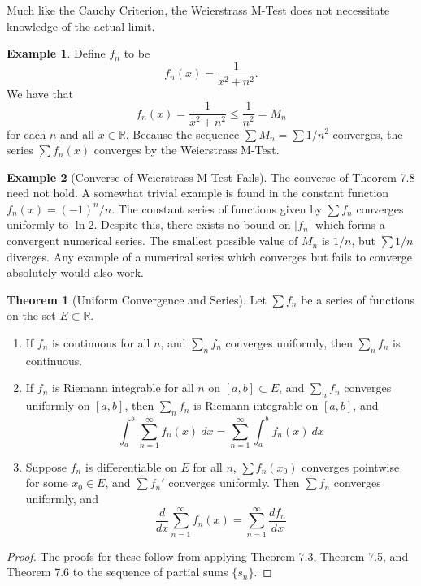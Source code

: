 \documentclass{article}
\newcommand{\R}{\mathbb{R}}
\theoremstyle{definition}
\newtheorem{theorem}{Theorem}[section]
\newtheorem{example}{Example}[section]
\begin{document}
Much like the Cauchy Criterion, the Weierstrass M-Test does not necessitate knowledge of the actual limit. 
\begin{example}
	Define $ f_n $ to be $$ f_n(x)=\frac{1}{x^2+n^2}.$$ We have that $$  f_n(x)=\frac{1}{x^2+n^2}\le \frac{1}{n^2}=M_n$$ for each $ n $ and all $ x\in\R $. Because the sequence $ \sum M_n=\sum 1/n^2 $ converges, the series $ \sum f_n(x) $ converges by the Weierstrass M-Test. 
\end{example}

\begin{example}[Converse of Weierstrass M-Test Fails]
	The converse of Theorem 7.8 need not hold. A somewhat trivial example is found in the constant function $ f_n(x)=(-1)^n/n $. The constant series of functions given by $ \sum f_n  $ converges uniformly to $ \ln 2 $. Despite this, there exists no bound on $ |f_n| $ which forms a convergent numerical series. The smallest possible value of $ M_n $ is $ 1/n $, but $ \sum 1/n $ diverges. Any example of a numerical series which converges but fails to converge absolutely would also work.
\end{example}

\begin{theorem}[Uniform Convergence and Series]
	Let $ \sum f_n $ be a series of functions on the set $ E\subset \R $.
	\begin{enumerate}
		\item If $ f_n $ is continuous for all $ n $, and $ \sum_n f_n $ converges uniformly, then $  \sum_n f_n $ is continuous. 
		\item If $ f_n $ is Riemann integrable for all $ n $ on $ [a,b]\subset E $, and $ \sum_n f_n $ converges uniformly on $ [a,b] $, then $  \sum_n f_n $ is Riemann integrable on $ [a,b] $, and $$ \int_{a}^{b}\sum_{n=1}^{\infty}f_n(x)\ dx=\sum_{n=1}^{\infty}\int_{a}^{b}f_n(x)\ dx $$ 
		\item Suppose $ f_n $ is differentiable on $ E $ for all $ n $, $ \sum f_n(x_0) $ converges pointwise for some $ x_0\in E $, and $ \sum f_n' $ converges uniformly. Then $ \sum f_n $ converges uniformly, and $$\frac{d}{dx}\sum_{n=1}^{\infty}f_n(x)=\sum_{n=1}^{\infty}\frac{df_n}{dx} $$
	\end{enumerate}
\end{theorem}
\begin{proof}
	The proofs for these follow from applying Theorem 7.3, Theorem 7.5, and Theorem 7.6 to the sequence of partial sums $ \{s_n\} $.
\end{proof}
\end{document}
